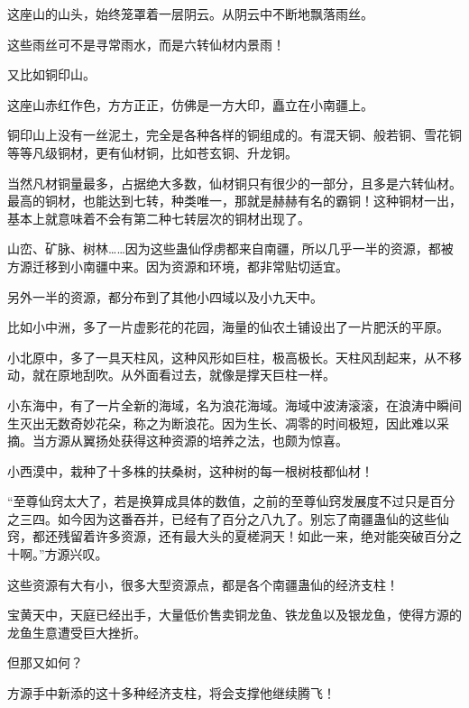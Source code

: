 \begin{this_body}
这座山的山头，始终笼罩着一层阴云。从阴云中不断地飘落雨丝。

这些雨丝可不是寻常雨水，而是六转仙材内景雨！

又比如铜印山。

这座山赤红作色，方方正正，仿佛是一方大印，矗立在小南疆上。

铜印山上没有一丝泥土，完全是各种各样的铜组成的。有混天铜、般若铜、雪花铜等等凡级铜材，更有仙材铜，比如苍玄铜、升龙铜。

当然凡材铜量最多，占据绝大多数，仙材铜只有很少的一部分，且多是六转仙材。最高的铜材，也能达到七转，种类唯一，那就是赫赫有名的霸铜！这种铜材一出，基本上就意味着不会有第二种七转层次的铜材出现了。

山峦、矿脉、树林……因为这些蛊仙俘虏都来自南疆，所以几乎一半的资源，都被方源迁移到小南疆中来。因为资源和环境，都非常贴切适宜。

另外一半的资源，都分布到了其他小四域以及小九天中。

比如小中洲，多了一片虚影花的花园，海量的仙农土铺设出了一片肥沃的平原。

小北原中，多了一具天柱风，这种风形如巨柱，极高极长。天柱风刮起来，从不移动，就在原地刮吹。从外面看过去，就像是撑天巨柱一样。

小东海中，有了一片全新的海域，名为浪花海域。海域中波涛滚滚，在浪涛中瞬间生灭出无数奇妙花朵，称之为断浪花。因为生长、凋零的时间极短，因此难以采摘。当方源从翼扬处获得这种资源的培养之法，也颇为惊喜。

小西漠中，栽种了十多株的扶桑树，这种树的每一根树枝都仙材！

“至尊仙窍太大了，若是换算成具体的数值，之前的至尊仙窍发展度不过只是百分之三四。如今因为这番吞并，已经有了百分之八九了。别忘了南疆蛊仙的这些仙窍，都还残留着许多资源，还有最大头的夏槎洞天！如此一来，绝对能突破百分之十啊。”方源兴叹。

这些资源有大有小，很多大型资源点，都是各个南疆蛊仙的经济支柱！

宝黄天中，天庭已经出手，大量低价售卖铜龙鱼、铁龙鱼以及银龙鱼，使得方源的龙鱼生意遭受巨大挫折。

但那又如何？

方源手中新添的这十多种经济支柱，将会支撑他继续腾飞！

\end{this_body}

